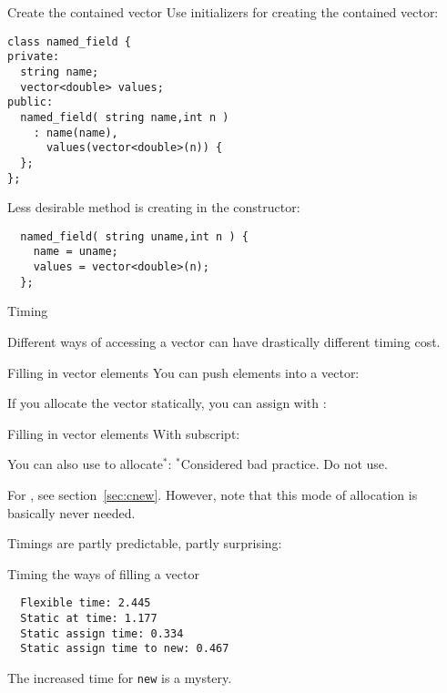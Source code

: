 \begin{block}{Create the contained vector}
  \label{sl:class-has-vector}
  Use initializers for creating the contained vector:
  \lstset{style=snippetcode}
\begin{lstlisting}
class named_field {
private:
  string name;
  vector<double> values;
public:
  named_field( string name,int n )
    : name(name),
      values(vector<double>(n)) {
  };
};
\end{lstlisting}

Less desirable method is creating in the constructor:
\begin{lstlisting}
  named_field( string uname,int n ) {
    name = uname;
    values = vector<double>(n);
  };
\end{lstlisting}
\end{block}

 {Timing}

Different ways of accessing a vector can have drastically different
timing cost.

\begin{block}{Filling in vector elements}
  \label{sl:vect-extend-code}
  You can push elements into a vector:

  If you allocate the vector statically, you can assign with :
\end{block}

\begin{block}{Filling in vector elements}
  \label{sl:vect-extend-code2}
  With subscript:

  You can also use  to allocate$^*$:
  $^*$Considered bad practice. Do not use.
\end{block}

For , see section~\ref{sec:cnew}. However, note that
this mode of allocation is basically never needed.

Timings are partly predictable, partly surprising:
\begin{block}{Timing the ways of filling a vector}
  \label{sl:vector-extend-time}
\begin{lstlisting}
  Flexible time: 2.445
  Static at time: 1.177
  Static assign time: 0.334
  Static assign time to new: 0.467
\end{lstlisting}
\end{block}

The increased time for \lstinline{new} is a mystery.

